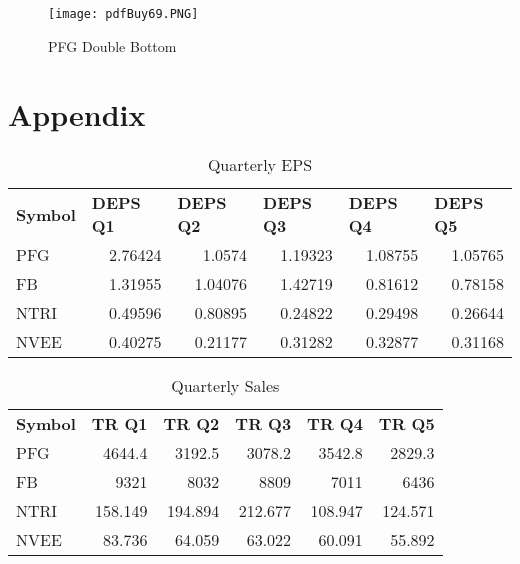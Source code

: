 \documentclass{article}
\begin{document}
\begin{figure}[h]
\centering
\texttt{[image: pdfBuy69.PNG]}
\caption{PFG Double Bottom}
\label{fig:PFG Double Bottom}
\end{figure}

\section{Appendix}
\begin{table}[htbp]
  \caption{Quarterly EPS}
   \begin{tabular}{lrrrrr}
    \textbf{Symbol} & \multicolumn{1}{l}{\textbf{DEPS Q1}} & \multicolumn{1}{l}{\textbf{DEPS Q2}} & \multicolumn{1}{l}{\textbf{DEPS Q3}} & \multicolumn{1}{l}{\textbf{DEPS Q4}} & \multicolumn{1}{l}{\textbf{DEPS Q5}} \\
    PFG   & 2.76424 & 1.0574 & 1.19323 & 1.08755 & 1.05765 \\
    FB    & 1.31955 & 1.04076 & 1.42719 & 0.81612 & 0.78158 \\
    NTRI  & 0.49596 & 0.80895 & 0.24822 & 0.29498 & 0.26644 \\
    NVEE  & 0.40275 & 0.21177 & 0.31282 & 0.32877 & 0.31168 \\
    \end{tabular}%
  \label{tab:addlabel}%
\end{table}%

\begin{table}[htbp]
  \caption{Quarterly Sales}
    \begin{tabular}{lrrrrr}
    \textbf{Symbol} & \multicolumn{1}{l}{\textbf{TR Q1}} & \multicolumn{1}{l}{\textbf{TR Q2}} & \multicolumn{1}{l}{\textbf{TR Q3}} & \multicolumn{1}{l}{\textbf{TR Q4}} & \multicolumn{1}{l}{\textbf{TR Q5}} \\
    PFG   & 4644.4 & 3192.5 & 3078.2 & 3542.8 & 2829.3 \\
    FB    & 9321  & 8032  & 8809  & 7011  & 6436 \\
    NTRI  & 158.149 & 194.894 & 212.677 & 108.947 & 124.571 \\
    NVEE  & 83.736 & 64.059 & 63.022 & 60.091 & 55.892 \\
    \end{tabular}%
  \label{tab:addlabel}%
\end{table}%
\end{document}
